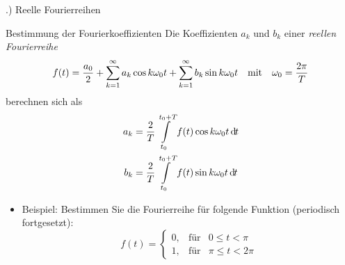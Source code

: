 \documentclass[t,14pt]{beamer}
\newcommand*\diff{\mathop{}\!\mathrm{d\hspace{-1pt}}}	%
\newcommand{\mitm}{\quad\textnormal{mit}\quad}
\begin{document}
\begin{frame}{\thesection .) Reelle Fourierreihen}
    \begin{alertblock}{Bestimmung der Fourierkoeffizienten}
        Die Koeffizienten $a_k$ und $b_k$ einer \emph{reellen Fourierreihe}
        \[
        f(t)=\frac{a_0}{2}+\suml_{k=1}^{\infty} a_k \cos k\omega_0 t +\suml_{k=1}^{\infty} b_k \sin k\omega_0 t \mitm \omega_0 =\frac{2\pi}{T}
        \]
        berechnen sich als
        \begin{align*}
            a_k &=\frac{2}{T}\intl_{t_0}^{t_0+T}f(t)\cos k\omega_0 t \diff t\\
            b_k &=\frac{2}{T}\intl_{t_0}^{t_0+T}f(t)\sin k\omega_0 t \diff t\\
        \end{align*}
    \end{alertblock}
    \begin{itemize}
        \item \alert{Beispiel:} Bestimmen Sie die Fourierreihe für folgende Funktion (periodisch fortgesetzt):
        \[
        f(t)=\left\{\begin{array}{lll}
            0,  &\text{für} & 0 \leq t < \pi \\
            1,  &\text{für} & \pi \leq t < 2\pi
        \end{array}     \right.
        \]
        \begin{center}
        \end{center}
        \begin{center}
        \end{center}
    \end{itemize}
\end{frame}
\end{document}

